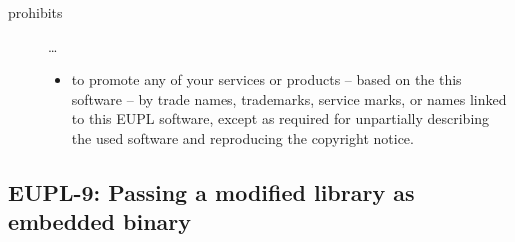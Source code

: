 \begin{description}
\begin{itemize}
\end{itemize}

\item[prohibits] \ldots
\begin{itemize}
  \item to promote any of your services or products -- based on the this software
  -- by trade names, trademarks, service marks, or names linked to this EUPL
  software, except as required for unpartially describing the used software and
  reproducing the copyright notice.
\end{itemize}

\end{description}


\subsection{EUPL-9: Passing a modified library as embedded binary}


